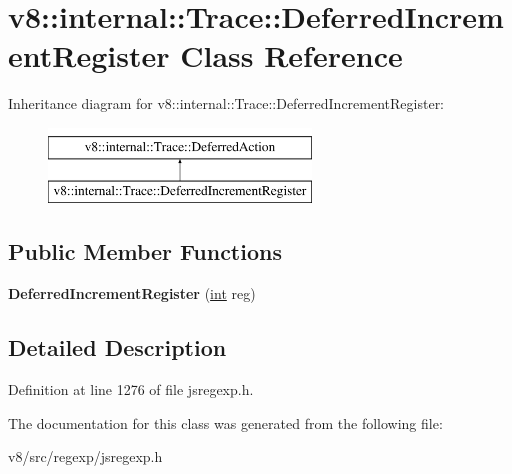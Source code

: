 \hypertarget{classv8_1_1internal_1_1Trace_1_1DeferredIncrementRegister}{}\section{v8\+:\+:internal\+:\+:Trace\+:\+:Deferred\+Increment\+Register Class Reference}
\label{classv8_1_1internal_1_1Trace_1_1DeferredIncrementRegister}
Inheritance diagram for v8\+:\+:internal\+:\+:Trace\+:\+:Deferred\+Increment\+Register\+:\begin{figure}[H]
\begin{center}
\leavevmode
\includegraphics[height=2.000000cm]{classv8_1_1internal_1_1Trace_1_1DeferredIncrementRegister}
\end{center}
\end{figure}
\subsection*{Public Member Functions}
\begin{DoxyCompactItemize}
\item 
\mbox{\label{classv8_1_1internal_1_1Trace_1_1DeferredIncrementRegister_a0e35fad1c635f9dc35105672d964b4e3}} 
{\bfseries Deferred\+Increment\+Register} (\mbox{\hyperlink{classint}{int}} reg)
\end{DoxyCompactItemize}


\subsection{Detailed Description}


Definition at line 1276 of file jsregexp.\+h.



The documentation for this class was generated from the following file\+:\begin{DoxyCompactItemize}
\item 
v8/src/regexp/jsregexp.\+h\end{DoxyCompactItemize}
